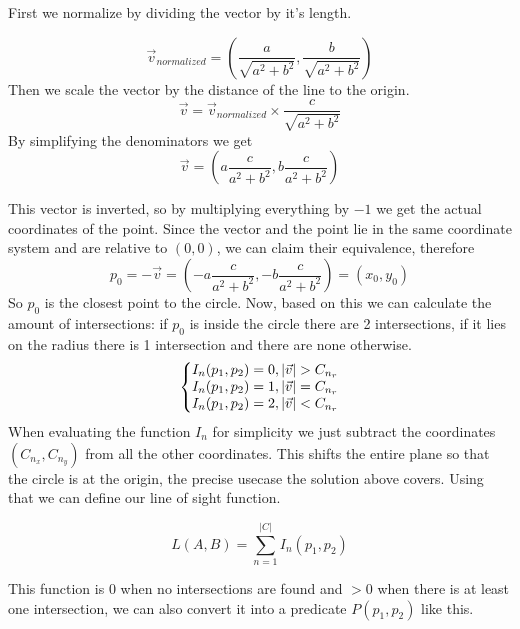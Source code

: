 \documentclass[12pt, titlepage]{article}
\begin{document}
First we normalize by dividing the vector by it's length.

\begin{equation}
    \vec{v}_{normalized}=\left(\frac{a}{\sqrt{a^2 + b^2}}, \frac{b}{\sqrt{a^2 + b^2}} \right)
\end{equation}
Then we scale the vector by the distance of the line to the origin.
\begin{equation}
    \vec{v}=\vec{v}_{normalized} \times \frac{c}{\sqrt{a^2 + b^2}}
\end{equation}
By simplifying the denominators we get
\begin{equation}
    \vec{v}=\left(a \frac{c}{a^2 + b^2}, b \frac{c}{a^2 + b^2}\right)
\end{equation}

This vector is inverted, so by multiplying everything by $-1$ we get the actual 
coordinates of the point. Since the vector and the point lie in the same coordinate
system and are relative to $(0, 0)$, we can claim their equivalence, therefore
\begin{equation}
    p_0 = -\vec{v} = (-a \frac{c}{a^2 + b^2}, -b \frac{c}{a^2 + b^2}) = (x_0, y_0)
\end{equation}
So $p_0$ is the closest point to the circle.
Now, based on this we can calculate the amount of intersections: if $p_0$ is inside
the circle there are 2 intersections, if it lies on the radius there is 1 intersection
and there are none otherwise.
\begin{equation}
    \left\{\begin{array}{@{}l@{}}
       I_n(p_1, p_2) = 0, |\vec{v}| > C_{n_r}\\
       I_n(p_1, p_2) = 1, |\vec{v}| = C_{n_r}\\
       I_n(p_1, p_2) = 2, |\vec{v}| < C_{n_r}
    \end{array}\right.
\end{equation}
When evaluating the function $I_n$ for simplicity we just subtract the 
coordinates $(C_{n_x}, C_{n_y})$ from all the other coordinates. This shifts 
the entire plane so that the circle is at the origin, the precise usecase the
solution above covers. Using that we can define our line of sight function.

$$L(A, B) = \sum^{|C|}_{n=1}I_n(p_1, p_2)$$

This function is 0 when no intersections are found and $> 0$ when there is
at least one intersection, we can also convert it into a predicate $P(p_1, p_2)$ like this.
\end{document}
